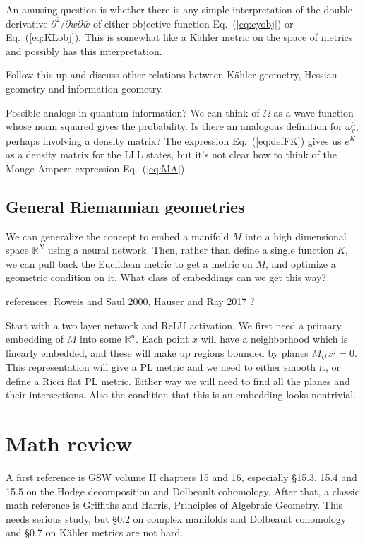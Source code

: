 \documentclass[12pt]{article}
\def\IR{\mathbb{R}}
\newcommand{\eq}[1]{Eq.~(\ref{eq:#1})}
\begin{document}
An amusing question is whether there is any simple interpretation of the double derivative
$\partial^2/\partial w\bar \partial \bar w$ of either objective function \eq{cyobj} or \eq{KLobj}.
This is somewhat like a K\"ahler metric
on the space of metrics and possibly has this interpretation.

Follow this up and discuss other relations between K\"ahler geometry, Hessian geometry and information geometry.

Possible analogs in quantum information?  We can think of $\Omega$ as a wave function whose norm squared
gives the probability.  Is there an analogous definition for $\omega_g^3$, perhaps involving a density matrix? 
The expression \eq{defFK} gives us $e^K$ as a density matrix for the LLL states, but it's not clear how to think
of the Monge-Ampere expression \eq{MA}.

\subsection{ General Riemannian geometries }

We can generalize the concept to embed a manifold $M$ into a high dimensional space $\IR^N$ using a neural network.
Then, rather than define a single function $K$, we can pull back the Euclidean metric to get a metric on $M$,
and optimize a geometric condition on it.  What class of embeddings can we get this way?

references: Roweis and Saul 2000, Hauser and Ray 2017 ?

Start with a two layer network and ReLU activation.  We first need a primary embedding of $M$ into some $\IR^n$.
Each point $x$ will have a neighborhood which is
linearly embedded, and these will make up regions bounded by planes $M_{ij} x^j=0$.  This representation
will give a PL metric and we need to either smooth it, or define a Ricci flat PL metric.  Either way we will need
to find all the planes and their intersections.  Also the condition that this is an embedding looks nontrivial.

\appendix

\section{ Math review }

A first reference is GSW volume II chapters 15 and 16, especially \S 15.3, 15.4 and 15.5 on 
the Hodge decomposition and Dolbeault cohomology.
After that, a classic math reference is Griffiths and Harris, Principles of Algebraic Geometry.
This needs serious study, but \S 0.2 on complex manifolds and Dolbeault cohomology
and \S 0.7 on K\"ahler metrics are not hard.
\end{document}
